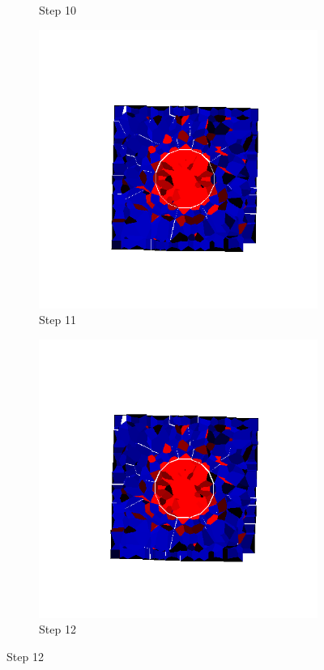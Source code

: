 \begin{figure}[ht!]
\begin{subfigure}{.25\textwidth}
      \caption{Step 10}
      \end{subfigure}%
      \begin{subfigure}{.25\textwidth}
        \centering
        \includegraphics[width=1.0\linewidth]{Files/Small_ASR/IS/DEP5-STEP(011).png}
      \caption{Step 11}
      \end{subfigure}%
      \begin{subfigure}{.25\textwidth}
        \centering
        \includegraphics[width=1.0\linewidth]{Files/Small_ASR/IS/DEP5-STEP(012).png}
      \caption{Step 12}
      \end{subfigure}


\end{figure}
